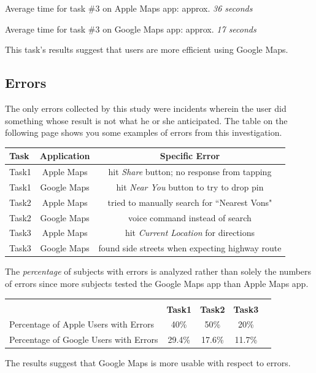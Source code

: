 \documentclass[a4paper; 11pt]{article}
\begin{document}
\begin{center}
\vspace{-.4in}
\par
Average time for task \#3 on Apple Maps app: approx. \textit{36 seconds}
\par
Average time for task \#3 on Google Maps app: approx. \textit{17 seconds}
\end{center}
\par
\noindent
This task's results suggest that users are more efficient using Google Maps. 

\subsection{Errors}
\par
The only errors collected by this study were incidents wherein the user did something whose result is not what he or she anticipated. The table on the following page shows you some examples of errors from this investigation.

\begin{table}[ht]
\centering
\begin{tabular}{l|c|c}
Task & Application & Specific Error\\\hline
Task1 & Apple Maps & hit \textit{Share} button; no response from tapping \\
Task1 & Google Maps & hit \textit{Near You} button to try to drop pin\\
Task2 & Apple Maps & tried to manually search for ``Nearest Vons"\\
Task2 & Google Maps & voice command instead of search\\
Task3 & Apple Maps & hit \textit{Current Location} for directions\\
Task3 & Google Maps & found side streets when expecting highway route
\end{tabular}
\end{table}
\par
The \textit{percentage} of subjects with errors is analyzed rather than solely the numbers of errors since more subjects tested the Google Maps app than Apple Maps app.
\begin{table}[ht]
\begin{tabular}{l c c c c}
& \multicolumn{4}{c}{}\\ %
& \textbf{Task1} & \textbf{Task2} & \textbf{Task3} \\
Percentage of Apple Users with Errors & 40\% & 50\%  & 20\% \\
Percentage of Google Users with Errors & 29.4\% & 17.6\%  & 11.7\% \\

\end{tabular}

\end{table}
\par
The results suggest that Google Maps is more usable with respect to errors.
\end{document}
